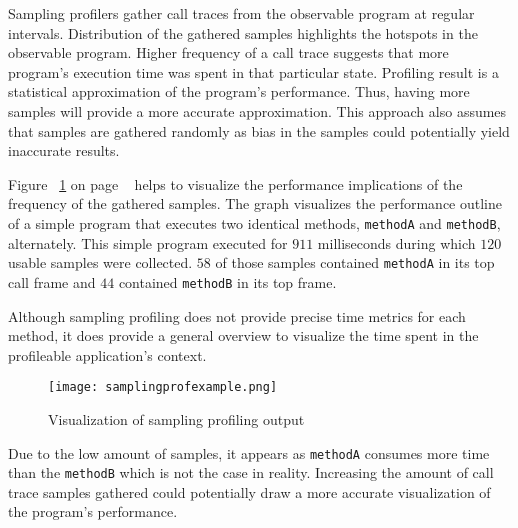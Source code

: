 \documentclass[..thesis.tex]{subfiles}
\begin{document}

Sampling profilers gather call traces from the observable program at regular intervals.  Distribution of the gathered samples highlights the hotspots in the observable program. Higher frequency of a call trace suggests that more program's execution time was spent in that particular state. Profiling result is a statistical approximation of the program's performance. Thus, having more samples will provide a more accurate approximation. This approach also assumes that samples are gathered randomly as bias in the samples could potentially yield inaccurate results. 


Figure ~\ref{fig:samplingProf} on page ~\pageref{fig:samplingProf} helps to visualize the performance implications of the frequency of the gathered samples. The graph visualizes the performance outline of a simple program that executes two identical methods, \texttt{methodA} and \texttt{methodB}, alternately. This simple program executed for $911$ milliseconds during which $120$ usable samples were collected. $58$ of those samples contained \texttt{methodA} in its top call frame and $44$ contained \texttt{methodB} in its top frame. 

Although sampling profiling does not provide precise time metrics for each method, it does  provide a general overview to visualize the time spent in the profileable application's context.

\begin{figure}[H]
\texttt{[image: samplingprofexample.png]}
\caption{Visualization of sampling profiling output}
\label{fig:samplingProf}
\end{figure}
Due to the low amount of samples, it appears as \texttt{methodA} consumes more time than the \texttt{methodB} which is not the case in reality. Increasing the amount of call trace samples gathered could potentially draw a more accurate visualization of the program's performance.
\end{document}
